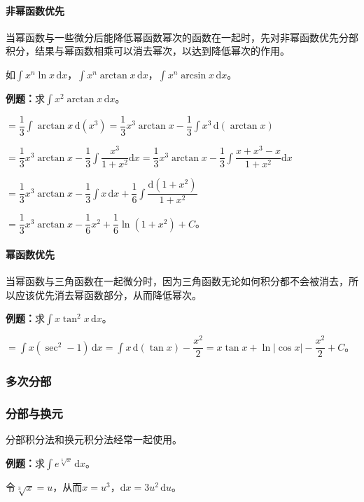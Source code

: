 \documentclass[UTF8, 12pt]{ctexart}
\begin{document}
\paragraph{非幂函数优先} \leavevmode \medskip

当幂函数与一些微分后能降低幂函数幂次的函数在一起时，先对非幂函数优先分部积分，结果与幂函数相乘可以消去幂次，以达到降低幂次的作用。

如$\int x^n\ln x\,\textrm{d}x$，$\int x^n\arctan x\,\textrm{d}x$，$\int x^n\arcsin x\,\textrm{d}x$。

\textbf{例题：}求$\int x^2\arctan x\,\textrm{d}x$。

$=\dfrac{1}{3}\int\arctan x\,\textrm{d}(x^3)=\dfrac{1}{3}x^3\arctan x-\dfrac{1}{3}\int x^3\,\textrm{d}(\arctan x)$

$=\dfrac{1}{3}x^3\arctan x-\dfrac{1}{3}\displaystyle{\int\dfrac{x^3}{1+x^2}\textrm{d}x}=\dfrac{1}{3}x^3\arctan x-\dfrac{1}{3}\displaystyle{\int\dfrac{x+x^3-x}{1+x^2}\textrm{d}x}$

$=\dfrac{1}{3}x^3\arctan x-\dfrac{1}{3}\int x\,\textrm{d}x+\displaystyle{\dfrac{1}{6}\int\dfrac{\textrm{d}(1+x^2)}{1+x^2}}$

$=\dfrac{1}{3}x^3\arctan x-\dfrac{1}{6}x^2+\dfrac{1}{6}\ln(1+x^2)+C$。

\paragraph{幂函数优先} \leavevmode \medskip

当幂函数与三角函数在一起微分时，因为三角函数无论如何积分都不会被消去，所以应该优先消去幂函数部分，从而降低幂次。

\textbf{例题：}求$\int x\tan^2x\,\textrm{d}x$。

$=\int x(\sec^2-1)\,\textrm{d}x=\int x\,\textrm{d}(\tan x)-\dfrac{x^2}{2}=x\tan x+\ln\vert\cos x\vert-\dfrac{x^2}{2}+C$。

\subsubsection{多次分部}

\subsubsection{分部与换元}

分部积分法和换元积分法经常一起使用。

\textbf{例题：}求$\int e^{\sqrt[3]{x}}\,\textrm{d}x$。

令$\sqrt[3]{x}=u$，从而$x=u^3$，$\textrm{d}x=3u^2\,\textrm{d}u$。
\end{document}
